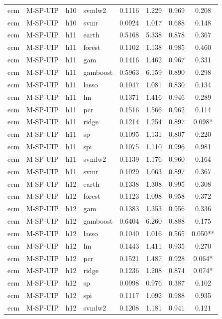 \begin{ThreePartTable}
\begin{longtable}[t]{llclcccc}
ecm & M-SP-UIP & h10 & svmlw2 & 0.1116 & 1.229 & 0.969 & 0.208\\
ecm & M-SP-UIP & h10 & svmr & 0.0924 & 1.017 & 0.688 & 0.148\\
\addlinespace
ecm & M-SP-UIP & h11 & earth & 0.5168 & 5.338 & 0.878 & 0.367\\
ecm & M-SP-UIP & h11 & forest & 0.1102 & 1.138 & 0.985 & 0.460\\
ecm & M-SP-UIP & h11 & gam & 0.1416 & 1.462 & 0.967 & 0.331\\
ecm & M-SP-UIP & h11 & gamboost & 0.5963 & 6.159 & 0.890 & 0.298\\
ecm & M-SP-UIP & h11 & lasso & 0.1047 & 1.081 & 0.830 & 0.134\\
ecm & M-SP-UIP & h11 & lm & 0.1371 & 1.416 & 0.946 & 0.289\\
ecm & M-SP-UIP & h11 & pcr & 0.1516 & 1.566 & 0.962 & 0.114\\
ecm & M-SP-UIP & h11 & ridge & 0.1214 & 1.254 & 0.897 & 0.098*\\
ecm & M-SP-UIP & h11 & sp & 0.1095 & 1.131 & 0.807 & 0.220\\
ecm & M-SP-UIP & h11 & spi & 0.1075 & 1.110 & 0.996 & 0.981\\
ecm & M-SP-UIP & h11 & svmlw2 & 0.1139 & 1.176 & 0.960 & 0.164\\
ecm & M-SP-UIP & h11 & svmr & 0.1029 & 1.063 & 0.897 & 0.367\\
\addlinespace
ecm & M-SP-UIP & h12 & earth & 0.1338 & 1.308 & 0.995 & 0.308\\
ecm & M-SP-UIP & h12 & forest & 0.1123 & 1.098 & 0.958 & 0.372\\
ecm & M-SP-UIP & h12 & gam & 0.1383 & 1.353 & 0.956 & 0.336\\
ecm & M-SP-UIP & h12 & gamboost & 0.6404 & 6.260 & 0.888 & 0.175\\
ecm & M-SP-UIP & h12 & lasso & 0.1040 & 1.016 & 0.565 & 0.050**\\
ecm & M-SP-UIP & h12 & lm & 0.1443 & 1.411 & 0.935 & 0.270\\
ecm & M-SP-UIP & h12 & pcr & 0.1521 & 1.487 & 0.928 & 0.064*\\
ecm & M-SP-UIP & h12 & ridge & 0.1236 & 1.208 & 0.874 & 0.074*\\
ecm & M-SP-UIP & h12 & sp & 0.0998 & 0.976 & 0.387 & 0.102\\
ecm & M-SP-UIP & h12 & spi & 0.1117 & 1.092 & 0.988 & 0.935\\
ecm & M-SP-UIP & h12 & svmlw2 & 0.1208 & 1.181 & 0.941 & 0.121\\

\end{longtable}
\end{ThreePartTable}
